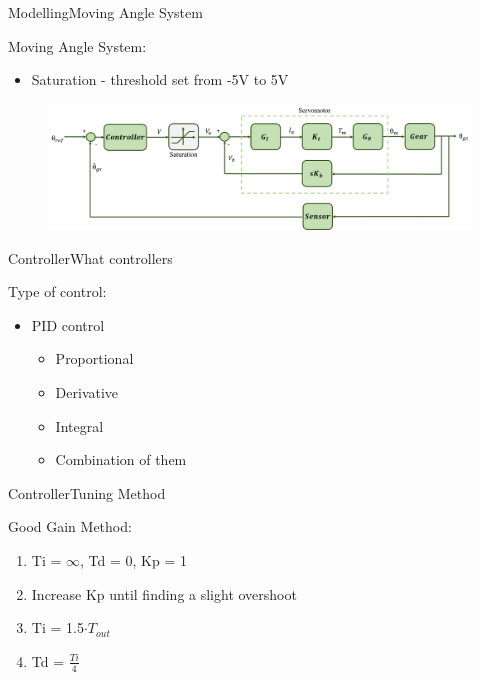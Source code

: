 \begin{frame}{Modelling}{Moving Angle System}
  \begin{block}{Moving Angle System:}

	  \begin{itemize}
	  	\item Saturation - threshold set from -5V to 5V
	  \end{itemize}

	  \begin{figure}
        \includegraphics[scale=0.24]{../report/figures/servo+gear+noise+saturation.png}
      \end{figure}
  
  \end{block}
\end{frame}


\begin{frame}{Controller}{What controllers}
  \begin{block}{Type of control:}

	  \begin{itemize}
	  	\item PID control
	 	\begin{itemize}
	  	\item Proportional
	  	\item Derivative
	  	\item Integral
	  	\item Combination of them
	  \end{itemize}
	  \end{itemize}


  \end{block}
\end{frame}

\begin{frame}{Controller}{Tuning Method}
  \begin{block}{Good Gain Method:}
	  \begin{enumerate}
	  	\item Ti = $\infty$, Td = 0, Kp = 1
	  	\item Increase Kp until finding a slight overshoot
		\item Ti = 1.5$\cdot T_{out}$
		\item Td = $\frac{Ti}{4}$
	  \end{enumerate}
	  
  \end{block}
\end{frame}

